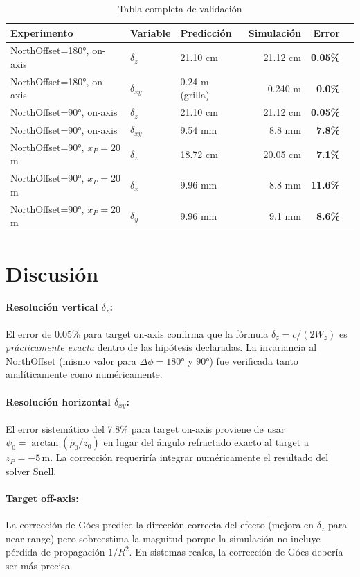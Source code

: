 \documentclass[12pt,a4paper,oneside]{book}
\begin{document}
\begin{table}[H]
\centering
\caption{Tabla completa de validación}
\label{tab:validation}
\begin{tabular}{lllrrr}
\toprule
Experimento & Variable & Predicción & Simulación & Error \\
\midrule
NorthOffset=180°, on-axis & $\delta_z$ & 21.10 cm & 21.12 cm & \textbf{0.05\%} \\
NorthOffset=180°, on-axis & $\delta_{xy}$ & 0.24 m (grilla) & 0.240 m & \textbf{0.0\%} \\
NorthOffset=90°, on-axis & $\delta_z$ & 21.10 cm & 21.12 cm & \textbf{0.05\%} \\
NorthOffset=90°, on-axis & $\delta_{xy}$ & 9.54 mm & 8.8 mm & \textbf{7.8\%} \\
NorthOffset=90°, $x_P=20$ m & $\delta_z$ & 18.72 cm & 20.05 cm & \textbf{7.1\%} \\
NorthOffset=90°, $x_P=20$ m & $\delta_x$ & 9.96 mm & 8.8 mm & \textbf{11.6\%} \\
NorthOffset=90°, $x_P=20$ m & $\delta_y$ & 9.96 mm & 9.1 mm & \textbf{8.6\%} \\
\bottomrule
\end{tabular}
\end{table}

\section{Discusión}

\paragraph{Resolución vertical $\delta_z$:}
El error de 0.05\% para target on-axis confirma que la fórmula $\delta_z = c/(2W_z)$ es \emph{prácticamente exacta} dentro de las hipótesis declaradas. La invariancia al NorthOffset (mismo valor para $\Delta\phi=180°$ y $90°$) fue verificada tanto analíticamente como numéricamente.

\paragraph{Resolución horizontal $\delta_{xy}$:}
El error sistemático del 7.8\% para target on-axis proviene de usar $\psi_0 = \arctan(\rho_0/z_0)$ en lugar del ángulo refractado exacto al target a $z_P=-5\,\text{m}$. La corrección requeriría integrar numéricamente el resultado del solver Snell.

\paragraph{Target off-axis:}
La corrección de Góes predice la dirección correcta del efecto (mejora en $\delta_z$ para near-range) pero sobreestima la magnitud porque la simulación no incluye pérdida de propagación $1/R^2$. En sistemas reales, la corrección de Góes debería ser más precisa.
\end{document}

